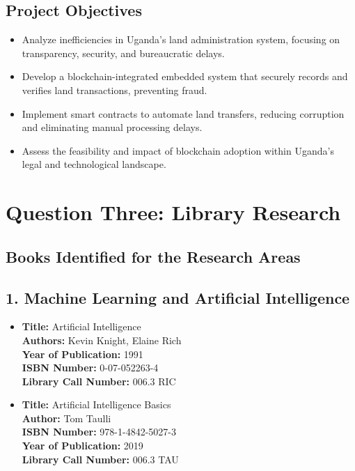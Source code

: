 \documentclass[11pt]{article}
\begin{document}
\subsection*{Project Objectives}
\begin{itemize}
    \item Analyze inefficiencies in Uganda’s land administration system, focusing on transparency, security, and bureaucratic delays.
    \item Develop a blockchain-integrated embedded system that securely records and verifies land transactions, preventing fraud.
    \item Implement smart contracts to automate land transfers, reducing corruption and eliminating manual processing delays.
    \item Assess the feasibility and impact of blockchain adoption within Uganda’s legal and technological landscape.
\end{itemize}


\newpage 
\section*{Question Three: Library Research}
\subsection*{Books Identified for the Research Areas}
\subsection*{1. Machine Learning and Artificial Intelligence}
\begin{itemize}
    \item \textbf{Title:} Artificial Intelligence \\
    \textbf{Authors:} Kevin Knight, Elaine Rich \\
    \textbf{Year of Publication:} 1991 \\
    \textbf{ISBN Number:} 0-07-052263-4 \\
    \textbf{Library Call Number:} 006.3 RIC\\
    
    \item \textbf{Title:} Artificial Intelligence Basics\\
    \textbf{Author:} Tom Taulli\\
    \textbf{ISBN Number:} 978-1-4842-5027-3 \\
    \textbf{Year of Publication:} 2019 \\
    \textbf{Library Call Number:} 006.3 TAU\\
\end{itemize}
\end{document}
